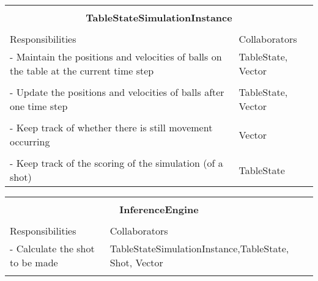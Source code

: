 \documentclass[titlepage]{article}
\begin{document}
\begin{table}[!htbp]
\centering
\begin{tabular}{| p{} | p{} |}\hline
	\multicolumn{2}{|l|}{}\\
	\multicolumn{2}{|c|}{\large{\textbf{TableStateSimulationInstance}}}\\
	\multicolumn{2}{|l|}{}\\\hline
	\vspace{0mm}\large{Responsibilities}\vspace{2mm} &\vspace{0mm}\large{Collaborators}\vspace{2mm}\\\hline
	\vspace{0mm}- Maintain the positions and velocities of balls on the table at the current time step	&\vspace{0mm}TableState, Vector\\&\\
	- Update the positions and velocities of balls after one time step									&TableState, Vector\\&\\
	- Keep track of whether there is still movement occurring											&Vector\\&\\
	- Keep track of the scoring of the simulation (of a shot)\vspace{2mm}								&TableState\vspace{2mm}\\\hline
\end{tabular}
\end{table}
\newpage

\begin{table}[!htbp]
\centering
\begin{tabular}{| p{} | p{} |}\hline
	\multicolumn{2}{|l|}{}\\
	\multicolumn{2}{|c|}{\large{\textbf{InferenceEngine}}}\\
	\multicolumn{2}{|l|}{}\\\hline
	\vspace{0mm}\large{Responsibilities}\vspace{2mm} &\vspace{0mm}\large{Collaborators}\vspace{2mm}\\\hline
	\vspace{0mm}- Calculate the shot to be made		&\vspace{0mm} TableStateSimulationInstance,\newline TableState, Shot, Vector\\&\\\hline
\end{tabular}
\end{table}
\end{document}
